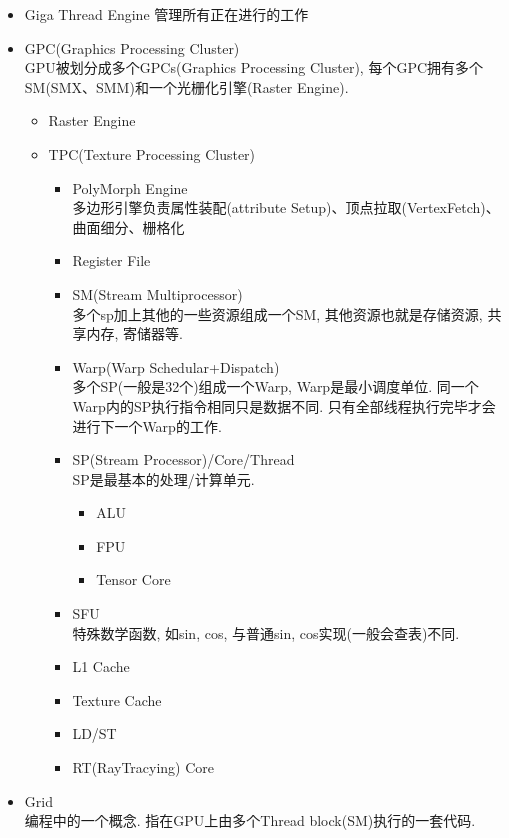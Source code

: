 \documentclass[UTF8]{ctexart}
\begin{document}
\begin{itemize}
\item Giga Thread Engine
  管理所有正在进行的工作
\item GPC(Graphics Processing Cluster)
  \\GPU被划分成多个GPCs(Graphics Processing Cluster), 每个GPC拥有多个SM(SMX、SMM)和一个光栅化引擎(Raster Engine).
  \begin{itemize}
  \item Raster Engine
  \item TPC(Texture Processing Cluster)
    \begin{itemize}
    \item PolyMorph Engine
      \\多边形引擎负责属性装配(attribute Setup)、顶点拉取(VertexFetch)、曲面细分、栅格化
    \item Register File
    \item SM(Stream Multiprocessor)
      \\多个sp加上其他的一些资源组成一个SM, 其他资源也就是存储资源, 共享内存, 寄储器等.
    \item Warp(Warp Schedular+Dispatch)
      \\多个SP(一般是32个)组成一个Warp, Warp是最小调度单位. 同一个Warp内的SP执行指令相同只是数据不同. 只有全部线程执行完毕才会进行下一个Warp的工作.
    \item SP(Stream Processor)/Core/Thread
      \\SP是最基本的处理/计算单元.
      \begin{itemize}
      \item ALU
      \item FPU
      \item Tensor Core
      \end{itemize}
    \item SFU
      \\特殊数学函数, 如sin, cos, 与普通sin, cos实现(一般会查表)不同.
    \item L1 Cache
    \item Texture Cache
    \item LD/ST
    \item RT(RayTracying) Core
    \end{itemize}
  \end{itemize}
\item Grid
  \\编程中的一个概念. 指在GPU上由多个Thread block(SM)执行的一套代码.
\end{itemize}
\end{document}
